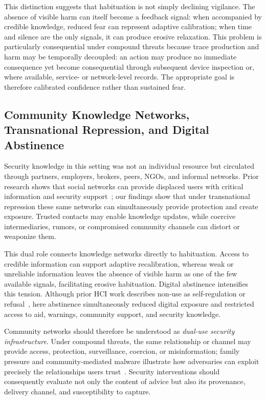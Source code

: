 \documentclass[conference,compsoc]{IEEEtran}
\begin{document}
This distinction suggests that habituation is not simply declining vigilance. The absence of visible harm can itself become a feedback signal: when accompanied by credible knowledge, reduced fear can represent adaptive calibration; when time and silence are the only signals, it can produce erosive relaxation. This problem is particularly consequential under compound threats because trace production and harm may be temporally decoupled: an action may produce no immediate consequence yet become consequential through subsequent device inspection or, where available, service- or network-level records. The appropriate goal is therefore calibrated confidence rather than sustained fear.

\subsection{Community Knowledge Networks, Transnational Repression, and Digital Abstinence}

Security knowledge in this setting was not an individual resource but circulated through partners, employers, brokers, peers, NGOs, and informal networks. Prior research shows that social networks can provide displaced users with critical information and security support~\cite{simko2018computer,tran2024security}; our findings show that under transnational repression these same networks can simultaneously provide protection and create exposure. Trusted contacts may enable knowledge updates, while coercive intermediaries, rumors, or compromised community channels can distort or weaponize them.

This dual role connects knowledge networks directly to habituation. Access to credible information can support adaptive recalibration, whereas weak or unreliable information leaves the absence of visible harm as one of the few available signals, facilitating erosive habituation. Digital abstinence intensifies this tension. Although prior HCI work describes non-use as self-regulation or refusal~\cite{baumer2013limiting,schoenebeck2014giving,satchell2009beyond}, here abstinence simultaneously reduced digital exposure and restricted access to aid, warnings, community support, and security knowledge.

Community networks should therefore be understood as \emph{dual-use security infrastructure}. Under compound threats, the same relationship or channel may provide access, protection, surveillance, coercion, or misinformation; family pressure and community-mediated malware illustrate how adversaries can exploit precisely the relationships users trust~\cite{moss2022going}. Security interventions should consequently evaluate not only the content of advice but also its provenance, delivery channel, and susceptibility to capture.
\end{document}
